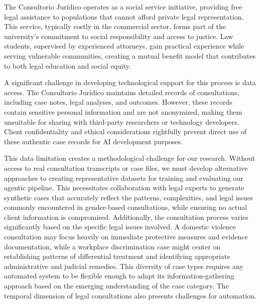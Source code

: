 The Consultorio Jurídico operates as a social service initiative, providing free legal assistance 
to populations that cannot afford private legal representation. This service, typically costly 
in the commercial sector, forms part of the university's commitment to social responsibility 
and access to justice. Law students, supervised by experienced attorneys, gain practical 
experience while serving vulnerable communities, creating a mutual benefit model that contributes 
to both legal education and social equity.

A significant challenge in developing technological support for this process is data access. 
The Consultorio Jurídico maintains detailed records of consultations, including case notes, 
legal analyses, and outcomes. However, these records contain sensitive personal information 
and are not anonymized, making them unsuitable for sharing with third-party researchers or 
technology developers. Client confidentiality and ethical considerations rightfully prevent 
direct use of these authentic case records for AI development purposes.

This data limitation creates a methodological challenge for our research. Without access to 
real consultation transcripts or case files, we must develop alternative approaches to creating 
representative datasets for training and evaluating our agentic pipeline. This necessitates 
collaboration with legal experts to generate synthetic cases that accurately reflect the patterns, 
complexities, and legal issues commonly encountered in gender-based consultations, while ensuring 
no actual client information is compromised.
Additionally, the consultation process varies significantly based on the specific legal issues 
involved. A domestic violence consultation may focus heavily on immediate protective 
measures and evidence documentation, while a workplace discrimination case might center on 
establishing patterns of differential treatment and identifying appropriate administrative and 
judicial remedies. This diversity of case types requires any automated system to be flexible enough 
to adapt its information-gathering approach based on the emerging understanding of the case category.
The temporal dimension of legal consultations also presents challenges for automation. 

